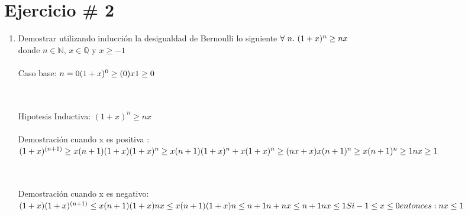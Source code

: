 \documentclass{article}
\begin{document}
\section{Ejercicio \# 2}
\begin{enumerate}
\item Demostrar utilizando inducci\'on la desigualdad de Bernoulli lo siguiente $\\ \forall\ n.\ (1+x)^n\geq nx $
\\donde $n\in \mathbb{N}$, $x\in \mathbb{Q}$ y $x\geq -1$
\\\\Caso base: $ n=0 \\ (1+x)^0\geq (0)x \\ 1\geq 0 $
    
\\\\Hipotesis Inductiva: $ (1+x)^n\geq nx $ 
\\\\Demostraci\'on cuando x es positiva :
\\ $(1+x)^{(n+1)} \geq x(n+1) \\ (1+x)(1+x)^n\geq x(n+1) \\ (1+x)^n+x(1+x)^n\geq (nx+x) \\  x(n+1)^n\geq x \\ (n+1)^n \geq 1 \\ nx \geq 1$

\\\\ Demostración cuando x es negativo:
\\ $(1+x)(1+x)^{(n+1)}\leq x(n+1) \\ (1+x)nx\leq x(n+1) \\ (1+x)n\leq n+1 \\n+nx\leq n+1 \\ nx\leq 1 \\ Si -1 \leq x\leq 0 \\ entonces: nx\leq 1 $ 
    
\end{enumerate}
\end{document}

